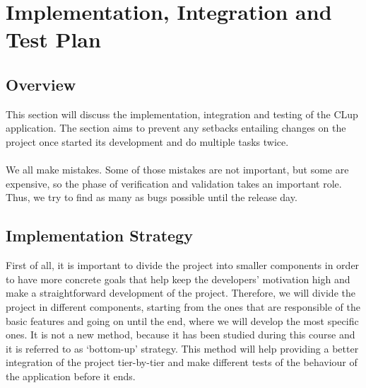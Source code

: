 \section{Implementation, Integration and Test Plan}
\subsection{Overview}
\vspace{0.5cm}
This section will discuss the implementation, integration and testing of the CLup application. The section aims to prevent any setbacks entailing changes on the project once started its development and do multiple tasks twice.\\
\\
We all make mistakes. Some of those mistakes are not important, but some are expensive, so the phase of verification and validation takes an important role. Thus, we try to find as many as bugs possible until the release day.

\subsection{Implementation Strategy}
\vspace{0.5cm}

First of all, it is important to divide the project into smaller components in order to have more concrete goals that help keep the developers’ motivation high and make a straightforward development of the project. Therefore, we will divide the project in different components, starting from the ones that are responsible of the basic features and going on until the end, where we will develop the most specific ones. It is not a new method, because it has been studied during this course and it is referred to as ‘bottom-up’ strategy. This method will help providing a better integration of the project tier-by-tier and make different tests of the behaviour of the application before it ends.
